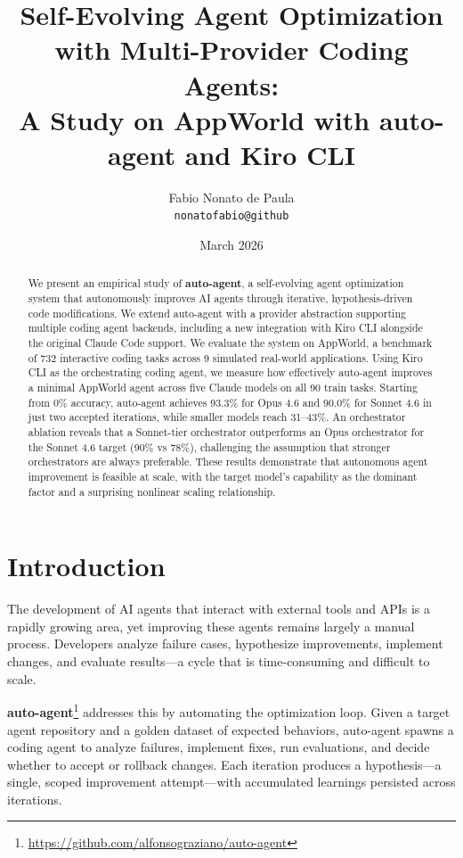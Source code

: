 \documentclass[11pt,a4paper]{article}
\title{Self-Evolving Agent Optimization with Multi-Provider Coding Agents:\\A Study on AppWorld with auto-agent and Kiro CLI}
\author{
  Fabio Nonato de Paula \\
  \texttt{nonatofabio@github}
}
\date{March 2026}
\begin{document}
\maketitle

\begin{abstract}
We present an empirical study of \textbf{auto-agent}, a self-evolving agent optimization system that autonomously improves AI agents through iterative, hypothesis-driven code modifications. We extend auto-agent with a provider abstraction supporting multiple coding agent backends, including a new integration with Kiro CLI alongside the original Claude Code support. We evaluate the system on AppWorld, a benchmark of 732 interactive coding tasks across 9 simulated real-world applications. Using Kiro CLI as the orchestrating coding agent, we measure how effectively auto-agent improves a minimal AppWorld agent across five Claude models on all 90 train tasks. Starting from 0\% accuracy, auto-agent achieves 93.3\% for Opus 4.6 and 90.0\% for Sonnet 4.6 in just two accepted iterations, while smaller models reach 31--43\%. An orchestrator ablation reveals that a Sonnet-tier orchestrator outperforms an Opus orchestrator for the Sonnet 4.6 target (90\% vs 78\%), challenging the assumption that stronger orchestrators are always preferable. These results demonstrate that autonomous agent improvement is feasible at scale, with the target model's capability as the dominant factor and a surprising nonlinear scaling relationship.
\end{abstract}

\section{Introduction}

The development of AI agents that interact with external tools and APIs is a rapidly growing area, yet improving these agents remains largely a manual process. Developers analyze failure cases, hypothesize improvements, implement changes, and evaluate results---a cycle that is time-consuming and difficult to scale.

\textbf{auto-agent}\footnote{\url{https://github.com/alfonsograziano/auto-agent}} addresses this by automating the optimization loop. Given a target agent repository and a golden dataset of expected behaviors, auto-agent spawns a coding agent to analyze failures, implement fixes, run evaluations, and decide whether to accept or rollback changes. Each iteration produces a hypothesis---a single, scoped improvement attempt---with accumulated learnings persisted across iterations.
\end{document}
